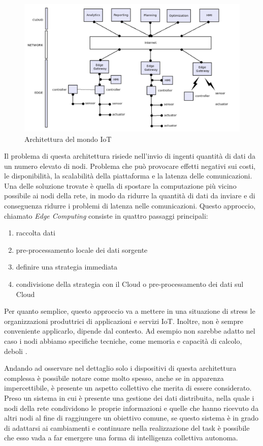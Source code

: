 \documentclass[12pt,a4paper,openright,twoside]{book}
\begin{document}
\begin{figure}
    \centering
    \includegraphics[width=.8\linewidth]{figures/iot-arc.png}
    \caption{Architettura del mondo IoT}
    \label{fig:iot-arc}
\end{figure}

Il problema di questa architettura risiede nell'invio di ingenti quantità di dati da un numero elevato di nodi. Problema che può provocare effetti negativi sui costi, le disponibilità, la scalabilità della piattaforma e la latenza delle comunicazioni. Una delle soluzione trovate è quella di spostare la computazione più vicino possibile ai nodi della rete, in modo da ridurre la quantità di dati da inviare e di conseguenza ridurre i problemi di latenza nelle comunicazioni. Questo approccio, chiamato \textit{Edge Computing} consiste in quattro passaggi principali: 

\begin{enumerate}
    \item raccolta dati
    \item pre-processamento locale dei dati sorgente
    \item definire una strategia immediata 
    \item condivisione della strategia con il Cloud o pre-processamento dei dati sul Cloud
\end{enumerate}

Per quanto semplice, questo approccio va a mettere in una situazione di stress le organizzazioni produttrici di applicazioni e servizi IoT. Inoltre, non è sempre conveniente applicarlo, dipende dal contesto. Ad esempio non sarebbe adatto nel caso i nodi abbiamo specifiche tecniche, come memoria e capacità di calcolo, deboli \cite{Testa2022}. 

Andando ad osservare nel dettaglio solo i dispositivi di questa architettura complessa è possibile notare come molto spesso, anche se in apparenza impercettibile, è presente un aspetto collettivo che merita di essere considerato. Preso un sistema in cui è presente una gestione dei dati distribuita, nella quale i nodi della rete condividono le proprie informazioni e quelle che hanno ricevuto da altri nodi al fine di raggiungere un obiettivo comune, se questo sistema è in grado di adattarsi ai cambiamenti e continuare nella realizzazione del task è possibile che esso vada a far emergere una forma di intelligenza collettiva autonoma. 
\end{document}

